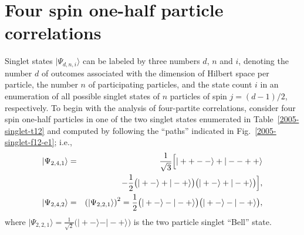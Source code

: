 \documentclass[rmp,amsfonts,showpacs,showkeys,preprint]{revtex4}
\begin{document}
\section{Four spin one-half particle correlations}

Singlet states $\vert \Psi_{d,n,i} \rangle$ can be labeled by three numbers $d$, $n$ and $i$,
denoting
the number $d$ of outcomes associated with the dimension of Hilbert space per particle,
the number $n$ of participating particles,
and the state count $i$ in an enumeration of all possible singlet states of $n$ particles of spin $j=(d-1)/2$, respectively.
To begin with the analysis of four-partite correlations, consider four spin one-half
particles in one of the two singlet states enumerated in Table~\ref{2005-singlet-t12} and
computed by following the ``paths'' indicated in Fig.~\ref{2005-singlet-f12-e1}; i.e.,
\begin{eqnarray}
\vert \Psi_{2,4,1} \rangle
&=&
{1\over \sqrt{3}}\Bigl[
\vert ++-- \rangle +
\vert --++ \rangle \nonumber \\
&&\qquad
\qquad
-  {1\over 2}
\bigl(
\vert +- \rangle +
\vert -+ \rangle
\bigr)
\bigl(
\vert +- \rangle +
\vert -+ \rangle
\bigr)
\Bigr],
\label{2005-hp-ep24s2}
\\
\vert \Psi_{2,4,2} \rangle
&=&
\left( \vert \Psi_{2,2,1} \rangle \right)^2
=
{1\over 2}
\bigl(
\vert +- \rangle -
\vert -+ \rangle
\bigr)
\bigl(
\vert +- \rangle -
\vert -+ \rangle
\bigr),
\label{2004-gtq-s1}
\end{eqnarray}
where
$\vert \Psi_{2,2,1} \rangle = \frac{1}{\sqrt{ 2}}
\bigl(
\vert +- \rangle -
\vert -+ \rangle
\bigr)
$
is the two particle singlet ``Bell'' state.
\end{document}
